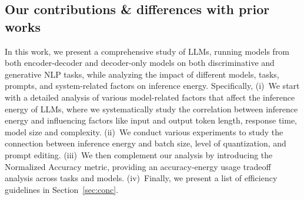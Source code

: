\subsection{Our contributions \& differences with prior works}
In this work, we present a comprehensive study of LLMs, running models from both encoder-decoder and decoder-only models on both discriminative and generative NLP tasks, while analyzing the impact of different models, tasks, prompts, and system-related factors on inference energy.
%
Specifically, 
(i)~We start with a detailed analysis of various model-related factors that affect the inference energy of LLMs, where we systematically study the correlation between inference energy and influencing factors like input and output token length, response time, model size and complexity. 
(ii)~We conduct various experiments to study the connection between inference energy and batch size, level of quantization, and prompt editing. 
(iii)~We then complement our analysis by introducing the Normalized Accuracy metric, providing an accuracy-energy usage tradeoff analysis across tasks and models. 
(iv)~Finally, we present a list of efficiency guidelines in Section~\ref{sec:conc}.
%



